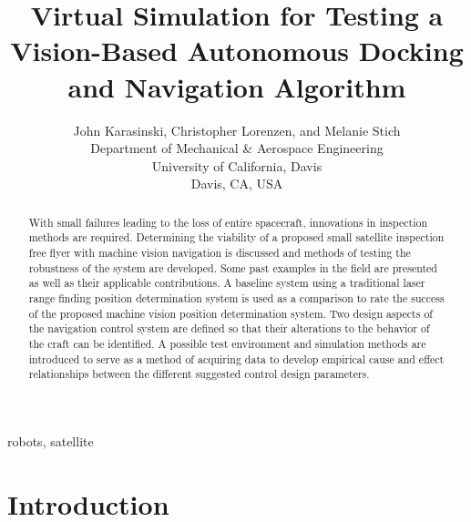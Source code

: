 \documentclass[journal, 10pt]{IEEEtran}
\begin{document}
\title{Virtual Simulation for Testing a Vision-Based Autonomous Docking and Navigation Algorithm}

\author{John Karasinski, Christopher Lorenzen, and Melanie Stich\\Department of Mechanical \& Aerospace Engineering\\University of California, Davis\\Davis, CA, USA }

\maketitle

\begin{abstract}
With small failures leading to the loss of entire spacecraft, innovations in inspection methods are required.  Determining the viability of a proposed small satellite inspection free flyer with machine vision navigation is discussed and methods of testing the robustness of the system are developed.  Some past examples in the field are presented as well as their applicable contributions.  A baseline system using a traditional laser range finding position determination system is used as a comparison to rate the success of the proposed machine vision position determination system.  Two design aspects of the navigation control system are defined so that their alterations to the behavior of the craft can be identified.  A possible test environment and simulation methods are introduced to serve as a method of acquiring data to develop empirical cause and effect relationships between the different suggested control design parameters.
\end{abstract}

\begin{IEEEkeywords}
robots, satellite
\end{IEEEkeywords}


\section{Introduction}
\end{document}
